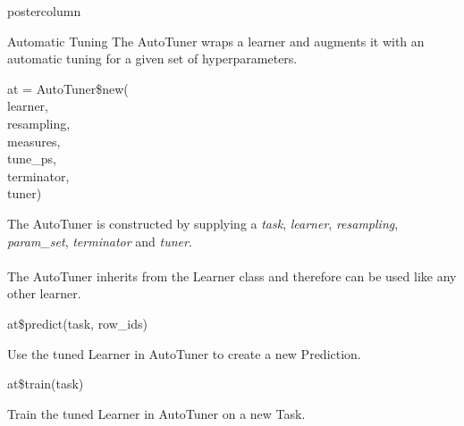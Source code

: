 \documentclass{beamer}
\newlength{\columnheight} %
\begin{document}
\begin{frame}[fragile]{}
\begin{columns}
\begin{column}{.245\textwidth}
\begin{beamercolorbox}[center]{postercolumn}
\begin{minipage}{.98\textwidth}
					\parbox[t][\columnheight]{\textwidth}{
						\begin{myblock}{Automatic Tuning}
						The AutoTuner wraps a learner and augments it with an automatic tuning for a given set of hyperparameters. 
						\\
						\begin{codeboxmultiline}[width=18cm]
							at = AutoTuner\$new(
\\
							\hspace*{1ex}learner,
\\
							\hspace*{1ex}resampling,
\\
							\hspace*{1ex}measures,
\\
							\hspace*{1ex}tune\_ps,
\\
							\hspace*{1ex}terminator,
\\
							\hspace*{1ex}tuner)
						\end{codeboxmultiline}
						The AutoTuner is constructed by supplying a \textit{task}, \textit{learner}, \textit{resampling}, \textit{param\_set}, \textit{terminator} and \textit{tuner}. 
						\\
						\\
						The AutoTuner inherits from the Learner class and therefore can be used like any other learner.
						\\
						\begin{codebox}
							at\$predict(task, row\_ids)
						\end{codebox}
						Use the tuned Learner in AutoTuner to create a new Prediction.
						\\
						\begin{codebox}
							at\$train(task)
						\end{codebox}
						Train the tuned Learner in AutoTuner on a new Task.
						\end{myblock}
					\vfill}
				\end{minipage}
			\end{beamercolorbox}
		\end{column}
	\end{columns}
\end{frame}
\end{document}
